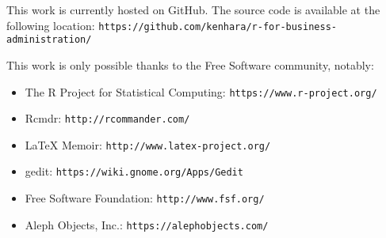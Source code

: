 %
%
%
%
%

\setlength{\parindent}{0pt}
This work is currently hosted on GitHub. The source code is available at the following location: \texttt{https://github.com/kenhara/r-for-business-administration/}

This work is only possible thanks to the Free Software community, notably:

\begin{itemize}
 \item The R Project for Statistical Computing: \texttt{https://www.r-project.org/}
 \item Rcmdr: \texttt{http://rcommander.com/}
 \item {\LaTeX} Memoir: \texttt{http://www.latex-project.org/}
 \item gedit: \texttt{https://wiki.gnome.org/Apps/Gedit}
 \item Free Software Foundation: \texttt{http://www.fsf.org/}
 \item Aleph Objects, Inc.: \texttt{https://alephobjects.com/}
\end{itemize}